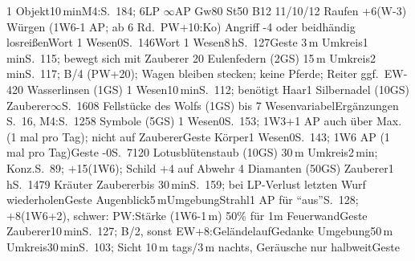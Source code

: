 \documentclass{m5figur-mv}[2014/12/31]
\begin{document}
{%
  {1 Objekt}{10\,min}{M4:S.~184; 6LP $\infty$AP Gw80 St50 B12 11/10/12
  Raufen +6(W-3) Würgen (1W6-1 AP; ab 6 Rd.\ PW+10:Ko)
  Angriff -4 oder beidhändig losreißen}{Wort}
%
  {1 Wesen}{0}{S.~146}{Wort}
%
  {1 Wesen}{8\,h}{S.~127}{Geste}
%
  {3\,m Umkreis}{1\,min}{S.~115; bewegt sich mit Zauberer}%
  {20 Eulenfedern (2GS)}
%
  {15\,m Umkreis}{2\,min}{S.~117; B/4 (PW+20); Wagen bleiben stecken;
  keine Pferde; Reiter ggf.\ EW-4}{20 Wasserlinsen (1GS)}
%
  {1 Wesen}{10\,min}{S.~112; benötigt Haar}{1 Silbernadel (10GS)}
%
  {Zauberer}{$\infty$}{S.~160}{8 Fellstücke des Wolfs (1GS)}
%
  {bis 7 Wesen}{variabel}{Ergänzungen S.~16, M4:S.~125}{8 Symbole (5GS)}
%
  {1 Wesen}{0}{S.~153; 1W3+1 AP auch über Max. (1 mal pro Tag);
  nicht auf Zauberer}{Geste}
%
  {Körper}{1 Wesen}{0}{S.~143; 1W6 AP (1 mal pro Tag)}{Geste}
%
  {-}{0}{S.~71}{20 Lotusblütenstaub (10GS)}
%
  {30\,m Umkreis}{2\,min; Konz.}{S.~89; +15(1W6); Schild +4 auf Abwehr}%
  {4 Diamanten (50GS)}
%
  {Zauberer}{1\,h}{S.~147}{9 Kräuter}
%
  {Zauberer}{bis 30\,min}{S.~159;
  bei LP-Verlust letzten Wurf wiederholen}{Geste}
%
  {Augenblick}{5\,m}{Umgebung}{Strahl}{1 AP für "`aus"'}{S.~128;
  +8(1W6+2), schwer: PW:Stärke (1W6-1\,m) 50\% für 1m Feuerwand}{Geste}
%
  {Zauberer}{10\,min}{S.~127; B/2, sonst EW+8:Geländelauf}{Gedanke}
%
  {Umgebung}{50\,m Umkreis}{30\,min}{S.~103; Sicht 10\,m tags/3\,m nachts,
  Geräusche nur halbweit}{Geste}



}%
\end{document}
